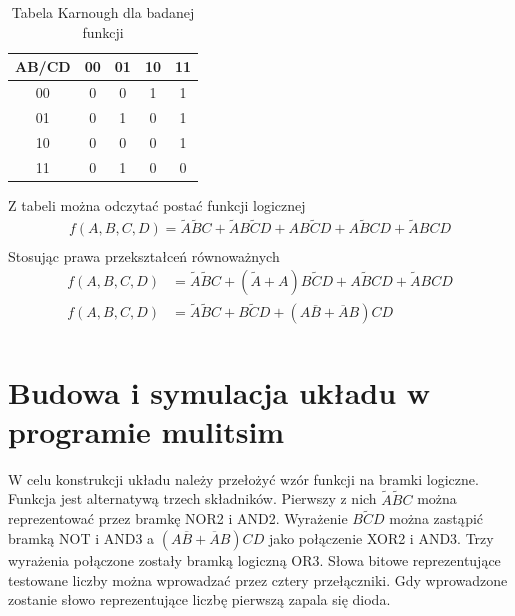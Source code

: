 \documentclass[12pt,a4paper,openright]{mwrep}
\begin{document}
\begin{table}[h!]
    \centering
    \begin{tabular}{|c|cccc|}
        \hline
        AB/CD & 00 & 01 & 10 & 11 \\
        \hline
        00 & 0 & 0 & 1 & 1 \\
        01 & 0 & 1 & 0 & 1 \\
        10 & 0 & 0 & 0 & 1 \\
        11 & 0 & 1 & 0 & 0 \\
        \hline
    \end{tabular}
    \caption{Tabela Karnough dla badanej funkcji}
\end{table}
Z tabeli można odczytać postać funkcji logicznej
\begin{align*}
    f(A,B,C,D) = \widetilde{A} \widetilde{B} C + \widetilde{A}B\widetilde{C}D 
    + AB\widetilde{C}D + A\widetilde{B}CD + \widetilde{A}BCD   \\ 
\end{align*}
Stosując prawa przekształceń równoważnych
\begin{align*}
    f(A,B,C,D) &= \widetilde{A} \widetilde{B} C + (\widetilde{A}  
    + A)B\widetilde{C}D + A\widetilde{B}CD + \widetilde{A}BCD   \\ 
    f(A,B,C,D) &= \widetilde{A} \widetilde{B} C 
    + B\widetilde{C}D + (A\overline{B} + \overline{A}B)CD\\
\end{align*}
\section{Budowa i symulacja układu w programie mulitsim}
W celu konstrukcji układu należy przełożyć wzór funkcji na bramki logiczne.
Funkcja jest alternatywą trzech składników.
Pierwszy z nich $ \widetilde{A} \widetilde{B} C $ można reprezentować
przez bramkę NOR2 i AND2. Wyrażenie $ B\widetilde{C}D $ można zastąpić bramką NOT i AND3
a $ (A\overline{B} + \overline{A}B)CD $ jako połączenie XOR2 i AND3.
Trzy wyrażenia połączone zostały bramką logiczną OR3. 
Słowa bitowe reprezentujące testowane liczby można wprowadzać przez cztery przełączniki.
Gdy wprowadzone zostanie słowo reprezentujące liczbę pierwszą zapala się dioda.
\end{document}
